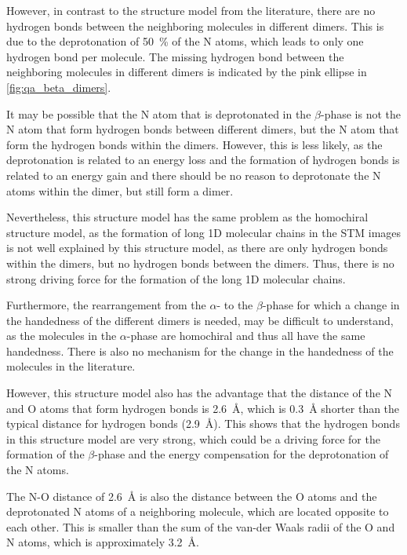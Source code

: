 However, in contrast to the structure model from the literature, there are no hydrogen bonds between the neighboring molecules in different dimers. This is due to the deprotonation of 50~\% of the N atoms, which leads to only one hydrogen bond per molecule. The missing hydrogen bond between the neighboring molecules in different dimers is indicated by the pink ellipse in \autoref{fig:qa_beta_dimers}.

It may be possible that the N atom that is deprotonated in the $\beta$-phase is not the N atom that form hydrogen bonds between different dimers, but the N atom that form the hydrogen bonds within the dimers. However, this is less likely, as the deprotonation is related to an energy loss and the formation of hydrogen bonds is related to an energy gain and there should be no reason to deprotonate the N atoms within the dimer, but still form a dimer.

Nevertheless, this structure model has the same problem as the homochiral structure model, as the formation of long 1D molecular chains in the \ac{STM} images is not well explained by this structure model, as there are only hydrogen bonds within the dimers, but no hydrogen bonds between the dimers. Thus, there is no strong driving force for the formation of the long 1D molecular chains.

Furthermore, the rearrangement from the $\alpha$- to the $\beta$-phase for which a change in the handedness of the different dimers is needed, may be difficult to understand, as the molecules in the $\alpha$-phase are homochiral and thus all have the same handedness. There is also no mechanism for the change in the handedness of the molecules in the literature.\autocite{Humberg2020,Humberg2025}

However, this structure model also has the advantage that the distance of the N and O atoms that form hydrogen bonds is 2.6~\si{\angstrom}, which is 0.3~\si{\angstrom} shorter than the typical distance for hydrogen bonds (2.9~\si{\angstrom}).\autocite{Taylor1984,Alvarez2013} This shows that the hydrogen bonds in this structure model are very strong, which could be a driving force for the formation of the $\beta$-phase and the energy compensation for the deprotonation of the N atoms. 

The N-O distance of 2.6~\si{\angstrom} is also the distance between the O atoms and the deprotonated N atoms of a neighboring molecule, which are located opposite to each other. This is smaller than the sum of the van-der Waals radii of the O and N atoms, which is approximately 3.2~\si{\angstrom}.\autocite{Alvarez2013} 

